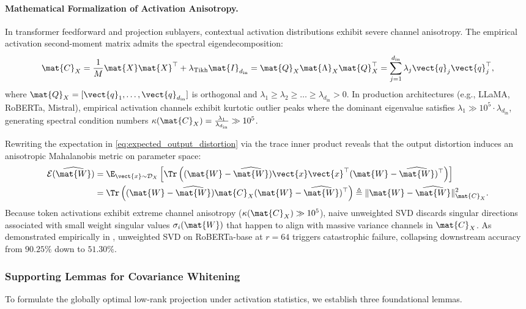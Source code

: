 \paragraph{Mathematical Formalization of Activation Anisotropy.}
In transformer feedforward and projection sublayers, contextual activation distributions exhibit severe channel anisotropy. The empirical activation second-moment matrix admits the spectral eigendecomposition:
\begin{equation}
\mat{C}_X = \frac{1}{M} \mat{X} \mat{X}^\top + \lambda_{\text{Tikh}} \mat{I}_{d_{\text{in}}} = \mat{Q}_X \mat{\Lambda}_X \mat{Q}_X^\top = \sum_{j=1}^{d_{\text{in}}} \lambda_j \vect{q}_j \vect{q}_j^\top,
\label{eq:anisotropic_covariance_spectral}
\end{equation}
where $\mat{Q}_X = [\vect{q}_1, \dots, \vect{q}_{d_{\text{in}}}]$ is orthogonal and $\lambda_1 \ge \lambda_2 \ge \dots \ge \lambda_{d_{\text{in}}} > 0$. In production architectures (e.g., LLaMA, RoBERTa, Mistral), empirical activation channels exhibit kurtotic outlier peaks where the dominant eigenvalue satisfies $\lambda_1 \gg 10^5 \cdot \lambda_{d_{\text{in}}}$, generating spectral condition numbers $\kappa(\mat{C}_X) = \frac{\lambda_1}{\lambda_{d_{\text{in}}}} \gg 10^5$. 

Rewriting the expectation in \eqref{eq:expected_output_distortion} via the trace inner product reveals that the output distortion induces an anisotropic Mahalanobis metric on parameter space:
\begin{align}
\mathcal{E}(\widehat{\mat{W}}) &= \E_{\vect{x} \sim \mathcal{D}_X} \left[ \Tr\left( (\mat{W} - \widehat{\mat{W}}) \vect{x} \vect{x}^\top (\mat{W} - \widehat{\mat{W}})^\top \right) \right] \nonumber \\
&= \Tr\left( (\mat{W} - \widehat{\mat{W}}) \mat{C}_X (\mat{W} - \widehat{\mat{W}})^\top \right) \triangleq \| \mat{W} - \widehat{\mat{W}} \|_{\mat{C}_X}^2.
\label{eq:mahalanobis_parameter_distortion}
\end{align}
Because token activations exhibit extreme channel anisotropy ($\kappa(\mat{C}_X) \gg 10^5$), naive unweighted SVD discards singular directions associated with small weight singular values $\sigma_i(\mat{W})$ that happen to align with massive variance channels in $\mat{C}_X$. As demonstrated empirically in , unweighted SVD on RoBERTa-base at $r=64$ triggers catastrophic failure, collapsing downstream accuracy from $90.25\%$ down to $51.30\%$.

\subsubsection{Supporting Lemmas for Covariance Whitening}
To formulate the globally optimal low-rank projection under activation statistics, we establish three foundational lemmas.

